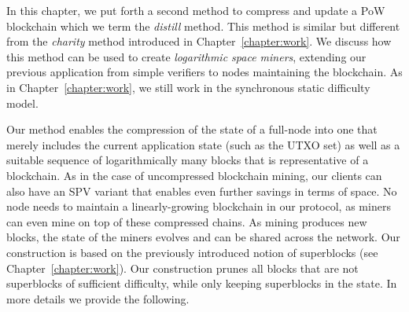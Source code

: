 In this chapter, we put forth a second method to compress and update
a PoW blockchain which we term the \emph{distill} method. This method is similar
but different from the \emph{charity} method introduced in
Chapter~\ref{chapter:work}. We discuss how this method can be used to create
\emph{logarithmic space miners}, extending our previous application from simple
verifiers to nodes maintaining the blockchain. As in Chapter~\ref{chapter:work},
we still work in the synchronous static difficulty model.

Our method enables the compression of
the state of a full-node into one that merely includes
the current application state (such as the UTXO set) as well as a suitable sequence of logarithmically many
blocks that
is representative of a blockchain. As in the case
of uncompressed blockchain mining, our clients can also have an SPV
variant that enables even further savings in terms of space.
No node needs to maintain a linearly-growing blockchain in our protocol, as
miners can even mine on top of these compressed chains. As mining produces new
blocks, the state of the miners evolves and can be shared across the network.
Our construction is based on the previously introduced notion of superblocks
(see Chapter~\ref{chapter:work}). Our construction prunes all blocks that
are not superblocks of sufficient difficulty, while only keeping superblocks in
the state.
In more details we provide the following.

